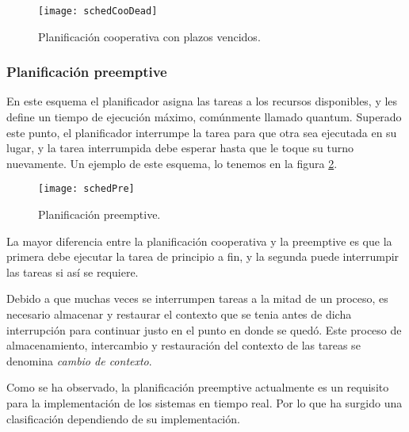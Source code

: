   \begin{figure}[ht]
      \centering
        \texttt{[image: schedCooDead]}
        \caption{Planificación cooperativa con plazos vencidos.\cite{medium}}
        \label{fig:schedcoodead}
    \end{figure}
    
\subsubsection{Planificación preemptive}

En este esquema el planificador asigna las tareas a los recursos disponibles, y les define un tiempo de ejecución máximo, comúnmente llamado quantum\cite{PreeK}. Superado este punto, el planificador interrumpe la tarea para que otra sea ejecutada en su lugar, y la tarea interrumpida debe esperar hasta que le toque su turno nuevamente. Un ejemplo de este esquema, lo tenemos en la figura \ref{fig:schedpree}.

  \begin{figure}[ht]
      \centering
        \texttt{[image: schedPre]}
        \caption{Planificación preemptive.\cite{medium}}
        \label{fig:schedpree}
    \end{figure}

La mayor diferencia entre la planificación cooperativa y la preemptive es que la primera debe ejecutar la tarea de principio a fin, y la segunda puede interrumpir las tareas si así se requiere.
\newline

Debido a que muchas veces se interrumpen tareas a la mitad de un proceso, es necesario almacenar y restaurar el contexto que se tenia antes de dicha interrupción para continuar justo en el punto en donde se quedó. Este proceso de almacenamiento, intercambio y restauración del contexto de las tareas se denomina \textit{cambio de contexto}.
\newline

Como se ha observado, la planificación preemptive actualmente es un requisito para la implementación de los sistemas en tiempo real. Por lo que ha surgido una clasificación dependiendo de su implementación\cite{Buttazzo2013}.

